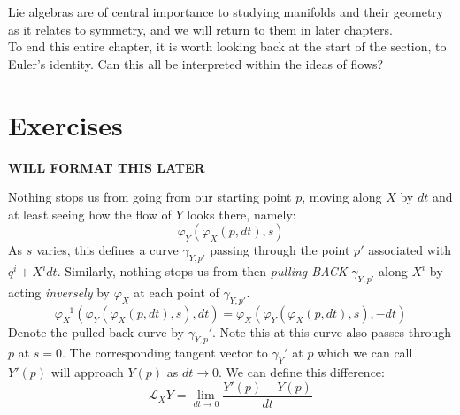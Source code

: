 \documentclass[../master.tex]{subfiles}
\begin{document}
		Lie algebras are of central importance to studying manifolds and their geometry as it relates to symmetry, and we will return to them in later chapters. \\
		
		To end this entire chapter, it is worth looking back at the start of the section, to Euler's identity. Can this all be interpreted within the ideas of flows? 
		
		
		
		
	
	\section{Exercises}

	\textbf{WILL FORMAT THIS LATER}


Nothing stops us from going from our starting point $p$, moving along $X$ by $dt$ and at least seeing how the flow of $Y$ looks there, namely:
	\begin{equation}
		\varphi_{Y} (\varphi_{X}(p, dt), s)
	\end{equation}
	As $s$ varies, this defines a curve $\gamma_{Y,p'}$ passing through the point $p'$ associated with $q^i + X^i dt$. Similarly, nothing stops us from then \emph{pulling BACK} $\gamma_{Y,p'}$ along $X^i$ by acting \emph{inversely} by $\varphi_X$ at each point of $\gamma_{Y,p'}$.
	\begin{equation}
		\varphi^{-1}_X (\varphi_Y (\varphi_X(p, dt), s), dt)
		 = \varphi_X (\varphi_Y(\varphi_X(p, dt), s), -dt)
	\end{equation}
	Denote the pulled back curve by $\gamma_{Y,p}'$. Note this at this curve also passes through $p$ at $s=0$. The corresponding tangent vector to $\gamma_Y'$ at $p$ which we can call $Y'(p)$ will approach $Y(p)$ as $dt \rightarrow 0$. We can define this difference:
	\begin{equation}
		\mathcal L_X Y = \lim_{dt \rightarrow 0} \frac{Y'(p) - Y(p)}{dt}
	\end{equation}
\end{document}
